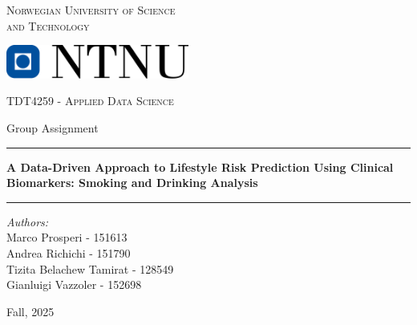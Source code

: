 \documentclass[11pt,a4paper]{article}
\begin{document}
\begin{titlepage}
\centering

\vspace*{2cm}

\begin{center}
{\large\textsc{Norwegian University of Science}}\\[0.2cm]
{\large\textsc{and Technology}}
\end{center}

\vspace{1.5cm}

\begin{center}
\includegraphics[width=6cm]{../images/NTNU_logo.png}
\end{center}

\vspace{1.5cm}

\begin{center}
{\large\textsc{TDT4259 - Applied Data Science}}
\end{center}

\vspace{1cm}

\begin{center}
{\normalsize Group Assignment}
\end{center}

\vspace{0.5cm}

\noindent\rule{\textwidth}{0.4pt}

\vspace{0.5cm}

\begin{center}
{\Large\bfseries A Data-Driven Approach to Lifestyle Risk Prediction Using Clinical Biomarkers: Smoking and Drinking Analysis}
\end{center}

\vspace{0.5cm}

\noindent\rule{\textwidth}{0.4pt}

\vspace{3cm}

\begin{center}
{\normalsize\textit{Authors:}}\\[0.3cm]
{\normalsize
Marco Prosperi - 151613\\
Andrea Richichi - 151790\\
Tizita Belachew Tamirat - 128549\\
Gianluigi Vazzoler - 152698}
\end{center}

\vfill
\begin{center}
{\normalsize Fall, 2025}
\end{center}

\vspace{1cm}

\end{titlepage}
\end{document}
